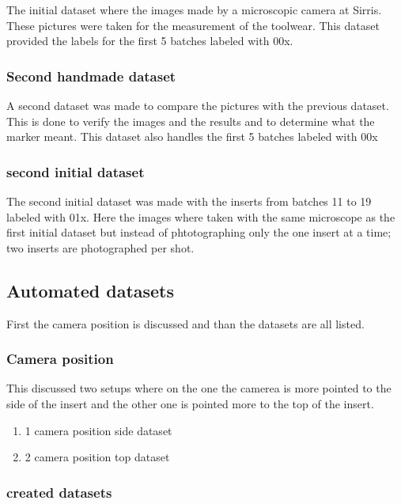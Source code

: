 \documentclass{article}
\begin{document}
	The initial dataset where the images made by a microscopic camera at Sirris. These pictures were taken for the measurement of the toolwear. This dataset provided the labels for the first 5 batches labeled with 00x.
	


\subsubsection{Second handmade dataset}

	A second dataset was made to compare the pictures with the previous dataset. This is done to verify the images and the results and to determine 	what the marker meant. This dataset also handles the first 5 batches labeled with 00x
	


\subsubsection{second initial dataset}

	The second initial dataset was made with the inserts from batches 11 to 19 labeled with 01x. Here the images where taken with the same microscope as the first initial dataset but instead of phtotographing only the one insert at a time; two inserts are photographed per shot.
	


\subsection{Automated datasets}

First the camera position is discussed and than the datasets are all listed.



\subsubsection{Camera position}

	This discussed two setups where on the one the camerea is more pointed to the side of the insert and the other one is pointed more to the top of the insert.
	
	\begin{enumerate}[1]
	\item 1 camera position side dataset
	\item 2 camera position top dataset
	\end{enumerate}


\subsubsection{created datasets}
\end{document}
